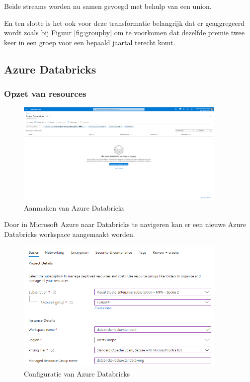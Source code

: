Beide streams worden nu samen gevoegd met behulp van een union.

En ten slotte is het ook voor deze transformatie belangrijk dat er geaggregeerd wordt zoals bij Figuur \ref{fig:groupby} om te voorkomen dat dezelfde premie twee keer in een groep voor een bepaald jaartal terecht komt.

\subsection{Azure Databricks}

\subsubsection{Opzet van resources}

\begin{figure}[H]
    \centering
    \includegraphics[width=0.9\textwidth]{./graphics/databricks/initial_1.png}
    \caption{Aanmaken van Azure Databricks}
\end{figure}

Door in Microsoft Azure naar Databricks te navigeren kan er een nieuwe Azure Databricks workspace aangemaakt worden.

\begin{figure}[H]
    \centering
    \includegraphics[width=0.9\textwidth]{./graphics/databricks/initial_2.png}
    \caption{Configuratie van Azure Databricks}
\end{figure}

